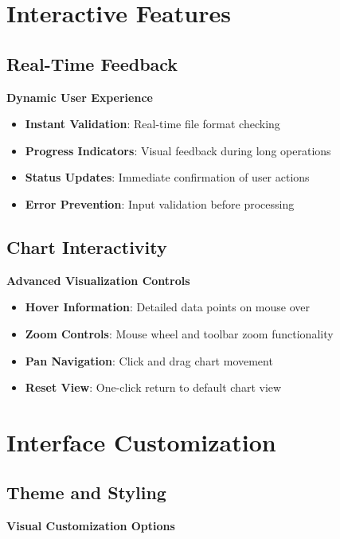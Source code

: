 \section{Interactive Features}

\subsection{Real-Time Feedback}

\textbf{Dynamic User Experience}

\begin{itemize}
    \item \textbf{Instant Validation}: Real-time file format checking
    \item \textbf{Progress Indicators}: Visual feedback during long operations
    \item \textbf{Status Updates}: Immediate confirmation of user actions
    \item \textbf{Error Prevention}: Input validation before processing
\end{itemize}

\subsection{Chart Interactivity}

\textbf{Advanced Visualization Controls}

\begin{itemize}
    \item \textbf{Hover Information}: Detailed data points on mouse over
    \item \textbf{Zoom Controls}: Mouse wheel and toolbar zoom functionality
    \item \textbf{Pan Navigation}: Click and drag chart movement
    \item \textbf{Reset View}: One-click return to default chart view
\end{itemize}

\section{Interface Customization}

\subsection{Theme and Styling}

\textbf{Visual Customization Options}

